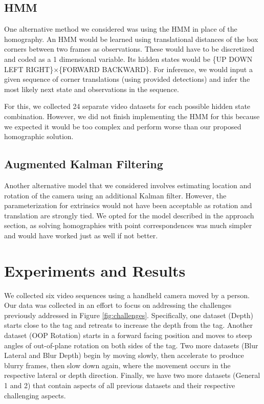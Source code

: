 \documentclass[letterpaper,10pt,conference]{IEEEtran}
\begin{document}
\subsection{HMM}
One alternative method we considered was using the HMM in place of the homography. An HMM would be learned using translational distances of the box corners between two frames as observations. These would have to be discretized and coded as a 1 dimensional variable. Its hidden states would be \{UP DOWN LEFT RIGHT\}$\times$\{FORWARD BACKWARD\}. For inference, we would input a given sequence of corner translations (using provided detections) and infer the most likely next state and observations in the sequence.

For this, we collected 24 separate video datasets for each possible hidden state combination. However, we did not finish implementing the HMM for this because we expected it would be too complex and perform worse than our proposed homographic solution.

\subsection{Augmented Kalman Filtering}
Another alternative model that we considered involves estimating location and rotation of the camera using an additional Kalman filter.  However, the parameterization for extrinsics would not have been acceptable as rotation and translation are strongly tied.  We opted for the model described in the approach section, as solving homographies with point correspondences was much simpler and would have worked just as well if not better.



\section{Experiments and Results}
\label{sec:results}
We collected six video sequences using a handheld camera moved by a person. Our data was collected in an effort to focus on addressing the challenges previously addressed in Figure \ref{fig:challenges}. Specifically, one dataset (Depth) starts close to the tag and retreats to increase the depth from the tag. Another dataset (OOP Rotation) starts in a forward facing position and moves to steep angles of out-of-plane rotation on both sides of the tag. Two more datasets (Blur Lateral and Blur Depth) begin by moving slowly, then accelerate to produce blurry frames, then slow down again, where the movement occurs in the respective lateral or depth direction. Finally, we have two more datasets (General 1 and 2) that contain aspects of all previous datasets and their respective challenging aspects.
\end{document}
